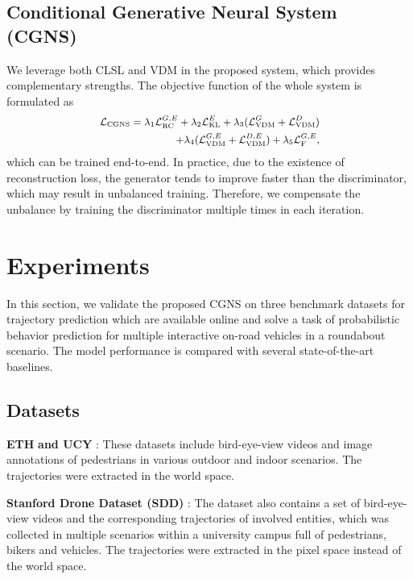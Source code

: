 \documentclass[letterpaper, 10 pt, conference]{ieeeconf}
\begin{document}
\subsection{Conditional Generative Neural System (CGNS)}
We leverage both CLSL and VDM in the proposed system, which provides complementary strengths.
The objective function of the whole system is formulated as
\begin{equation}
\small
\begin{aligned}
\mathcal{L}_{\text{CGNS}} = \lambda_1\mathcal{L}^{G,E}_{\text{RC}} + \lambda_{2}\mathcal{L}^E_{\text{KL}} +
\lambda_3(\mathcal{L}^G_{\text{VDM}}+\mathcal{L}^D_{\text{VDM}})\\ + \lambda_4(\mathcal{L}^{G,E}_{\text{VDM}}+\mathcal{L}^{D,E}_{\text{VDM}})+ \lambda_5 \mathcal{L}^{G,E}_{\text{F}},
\end{aligned}
\end{equation}
which can be trained end-to-end.
In practice, due to the existence of reconstruction loss, the generator tends to improve faster than the discriminator, which may result in unbalanced training. Therefore, we compensate the unbalance by training the discriminator multiple times in each iteration.

\section{Experiments}
In this section, we validate the proposed CGNS on three benchmark datasets for trajectory prediction which are available online and solve a task of probabilistic behavior prediction for multiple interactive on-road vehicles in a roundabout scenario. The model performance is compared with several state-of-the-art baselines.

\subsection{Datasets}

\vspace{0.1cm}
\noindent
\textbf{ETH} \cite{ETH_dataset} \textbf{and UCY} \cite{UCY_dataset}: These datasets include bird-eye-view videos and image annotations of pedestrians in various outdoor and indoor scenarios. The trajectories were extracted in the world space.

\vspace{0.1cm}
\noindent
\textbf{Stanford Drone Dataset (SDD)} \cite{A10}: The dataset also contains a set of bird-eye-view videos and the corresponding trajectories of involved entities, which was collected in multiple scenarios within a university campus full of pedestrians, bikers and vehicles. The trajectories were extracted in the pixel space instead of the world space.
\end{document}
